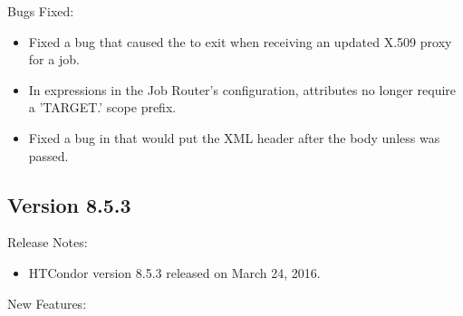 \noindent Bugs Fixed:

\begin{itemize}

\item Fixed a bug that caused the  to exit when receiving
an updated X.509 proxy for a job.

\item In expressions in the Job Router's configuration, attributes no
longer require a 'TARGET.' scope prefix.

\item Fixed a bug in   that would put the XML header
after the body unless  was passed.

\end{itemize}

\subsection*{\label{sec:New-8-5-3}Version 8.5.3}

\noindent Release Notes:

\begin{itemize}

\item HTCondor version 8.5.3 released on March 24, 2016.

\end{itemize}

\noindent New Features:

